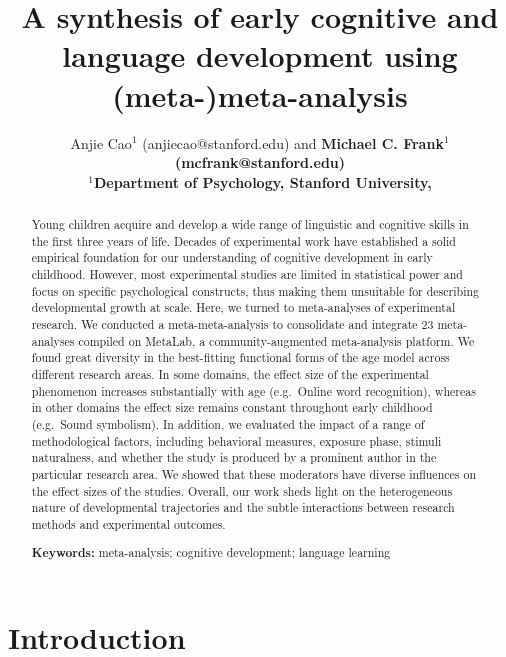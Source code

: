 \documentclass[10pt, letterpaper]{article}
\title{A synthesis of early cognitive and language development using
(meta-)meta-analysis}
\author{Anjie Cao$^1$  (anjiecao@stanford.edu)
 and \bf{Michael C. Frank$^1$ (mcfrank@stanford.edu)} \\
$^1$Department of Psychology, Stanford University, }
\begin{document}
\maketitle

\begin{abstract}
Young children acquire and develop a wide range of linguistic and
cognitive skills in the first three years of life. Decades of
experimental work have established a solid empirical foundation for our
understanding of cognitive development in early childhood. However, most
experimental studies are limited in statistical power and focus on
specific psychological constructs, thus making them unsuitable for
describing developmental growth at scale. Here, we turned to
meta-analyses of experimental research. We conducted a
meta-meta-analysis to consolidate and integrate 23 meta-analyses
compiled on MetaLab, a community-augmented meta-analysis platform. We
found great diversity in the best-fitting functional forms of the age
model across different research areas. In some domains, the effect size
of the experimental phenomenon increases substantially with age
(e.g.~Online word recognition), whereas in other domains the effect size
remains constant throughout early childhood (e.g.~Sound symbolism). In
addition, we evaluated the impact of a range of methodological factors,
including behavioral measures, exposure phase, stimuli naturalness, and
whether the study is produced by a prominent author in the particular
research area. We showed that these moderators have diverse influences
on the effect sizes of the studies. Overall, our work sheds light on the
heterogeneous nature of developmental trajectories and the subtle
interactions between research methods and experimental outcomes.

\textbf{Keywords:}
meta-analysis; cognitive development; language learning
\end{abstract}

\hypertarget{introduction}{%
\section{Introduction}\label{introduction}}
\end{document}
